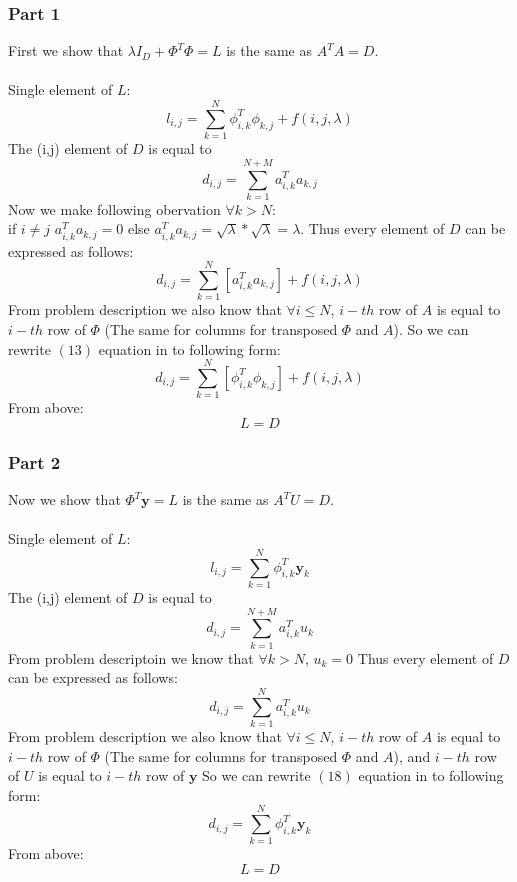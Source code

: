 \documentclass{article}
\begin{document}
\subsubsection{Part 1}
First we show that $\lambda I_D + \Phi^T\Phi = L $ is the same as $A^TA = D$.\\\\
Single element of $L$:
\begin{equation}
    l_{i,j} = \sum_{k=1}^{N}\phi_{i,k}^T\phi_{k,j} + f(i,j,\lambda)    
\end{equation}
The (i,j) element of $D$ is equal to 
\begin{equation}
    d_{i,j} = \sum_{k=1}^{N+M}a_{i,k}^Ta_{k,j}    
\end{equation}
Now we make following obervation $\forall k>N$:\\
if $i\neq j$ $a_{i,k}^Ta_{k,j} = 0$ else $a_{i,k}^Ta_{k,j} = \sqrt{\lambda}* \sqrt{\lambda} = \lambda$. 
Thus every element of $D$ can be expressed as follows:
\begin{equation}
    d_{i,j} = \sum_{k=1}^N[a_{i,k}^Ta_{k,j}] + f(i,j,\lambda)
\end{equation} 
From problem description we also know that $\forall i \leq N$, $i-th$ row of $A$ is equal to $i-th$ row of $\Phi$
(The same for columns for transposed $\Phi$ and $A$).
So we can rewrite $(13)$ equation in to following form:
\begin{equation}
    d_{i,j} = \sum_{k=1}^N[\phi_{i,k}^T\phi_{k,j}] + f(i,j,\lambda)
\end{equation} 
From above:
\begin{equation}
    L = D
\end{equation}
\subsubsection{Part 2}
Now we show that $\Phi^T\mathbf{y} = L$ is the same as $A^TU = D$.\\\\
Single element of $L$:
\begin{equation}
    l_{i,j} = \sum_{k=1}^{N}\phi_{i,k}^T\mathbf{y}_k     
\end{equation}
The (i,j) element of $D$ is equal to 
\begin{equation}
    d_{i,j} = \sum_{k=1}^{N+M}a_{i,k}^Tu_{k}    
\end{equation} 
From problem descriptoin we know that $\forall k>N$, $u_k = 0$ 
Thus every element of $D$ can be expressed as follows:
\begin{equation}
    d_{i,j} = \sum_{k=1}^{N}a_{i,k}^Tu_{k} 
\end{equation} 
From problem description we also know that $\forall i \leq N$, 
$i-th$ row of $A$ is equal to $i-th$ row of $\Phi$ (The same for columns for transposed $\Phi$ and $A$),
and $i-th$ row of $U$ is equal to $i-th$ row of $\mathbf{y}$
So we can rewrite $(18)$ equation in to following form:
\begin{equation}
    d_{i,j} = \sum_{k=1}^{N}\phi_{i,k}^T\mathbf{y}_k
\end{equation} 
From above:
\begin{equation}
    L = D
\end{equation}
\end{document}
